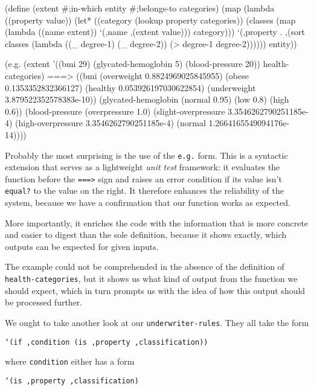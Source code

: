 \begin{Snippet}
(define (extent #;in-which entity #;belongs-to categories)
  (map (lambda ((property value))
	 (let* ((category (lookup property categories))
		(classes (map (lambda ((name extent))
				`(,name ,(extent value)))
			      category)))
	   `(,property . ,(sort classes
				(lambda ((_ degree-1) (_ degree-2))
				  (> degree-1 degree-2))))))
       entity))
\end{Snippet}
\begin{Snippet}
(e.g.
 (extent '((bmi 29) (glycated-hemoglobin 5) (blood-pressure 20))
         health-categories)
 ===> ((bmi (overweight 0.8824969025845955) 
            (obese 0.1353352832366127) 
            (healthy 0.053926197030622854)
            (underweight 3.879522352578383e-10)) 
       (glycated-hemoglobin (normal 0.95) (low 0.8) (high 0.6)) 
       (blood-pressure (overpressure 1.0) 
                       (slight-overpressure 3.3546262790251185e-4) 
                       (high-overpressure 3.3546262790251185e-4)
                       (normal 1.2664165549094176e-14))))
\end{Snippet}

Probably the most surprising is the use of the \texttt{e.g.} form.
This is a syntactic extension that serves as a lightweight
\textit{unit test} framework: it evaluates the function before
the \texttt{===>} sign and raises an error condition if
its value isn't \texttt{equal?} to the value on the right.
It therefore enhances the reliability of the system, because
we have a confirmation that our function works as expected.

More importantly, it enriches the code with the information that
is more concrete and easier to digest than the sole definition,
because it shows exactly, which outputs can be expected for
given inputs.

The example could not be comprehended in the absence of
the definition of \texttt{health-categories}, but it shows
us what kind of output from the function we should expect,
which in turn prompts us with the idea of how this output
should be processed further.

We ought to take another look at our \texttt{underwriter\--rules}.
They all take the form 

\texttt{`(if ,condition (is ,property ,classification))}

where \texttt{condition} either has a form 

\texttt{`(is ,property ,classification)}

